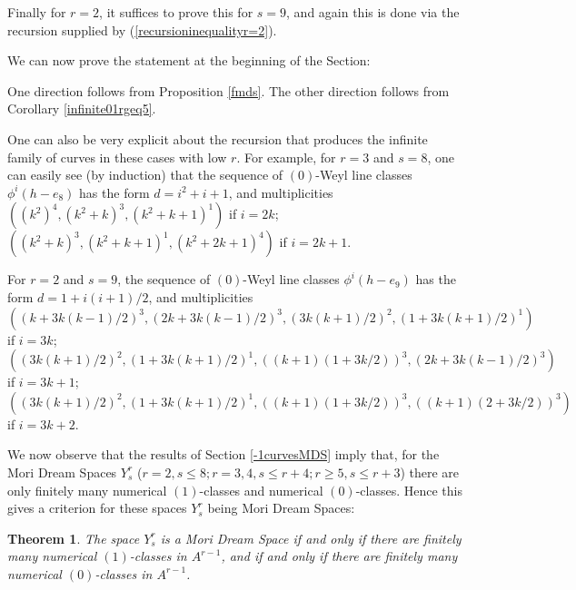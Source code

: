 \documentclass[12pt]{article}
\newtheorem{theorem}[equation]{Theorem}
\numberwithin{equation}{section}
\numberwithin{subeq}{equation}
\begin{document}
Finally for $r=2$, it suffices to prove this for $s=9$, and again this is done via
the recursion supplied by (\ref{recursioninequalityr=2}).


We can now prove the statement at the beginning of the Section:



\medskip{}
One direction follows from Proposition \ref{fmds}. The other direction follows from Corollary \ref{infinite01rgeq5}.


One can also be very explicit about the recursion that produces the infinite family of curves in these cases with low $r$.
For example, for $r=3$ and $s=8$, one can easily see (by induction) that the sequence of $(0)$-Weyl line classes $\phi^{i}(h-e_8)$ has the form $d = i^2+i+1$, and multiplicities
$((k^2)^4, (k^2+k)^3, (k^2+k+1)^1)$ if $i=2k$;
$((k^2+k)^3, (k^2+k+1)^1,(k^2+2k+1)^4)$ if $i=2k+1$.

For $r=2$ and $s=9$, 
the sequence of $(0)$-Weyl line classes $\phi^{i}(h-e_9)$ has the form
$d = 1+i(i+1)/2$, and multiplicities
$((k+3k(k-1)/2)^3, (2k+3k(k-1)/2)^3, (3k(k+1)/2)^2, (1+3k(k+1)/2)^1)$ if $i=3k$;
$((3k(k+1)/2)^2, (1+3k(k+1)/2)^1, ((k+1)(1+3k/2))^3, (2k+3k(k-1)/2)^3)$ if $i=3k+1$;
$((3k(k+1)/2)^2, (1+3k(k+1)/2)^1, ((k+1)(1+3k/2))^3, ((k+1)(2+3k/2))^3)$ if $i=3k+2$.


We now observe that the results of Section \ref{-1curvesMDS} imply that,
for the Mori Dream Spaces $Y^r_s$
($r=2, s \leq 8; r=3,4, s \leq r+4; r \geq 5, s \leq r+3$)
there are only finitely many numerical $(1)$-classes
and numerical $(0)$-classes.
Hence this gives a criterion for these spaces $Y^r_s$ being Mori Dream Spaces:


\begin{theorem}\label{finiteclass}
The space $Y^r_s$ is a Mori Dream Space
if and only if there are finitely many numerical $(1)$-classes in $A^{r-1}$,
and if and only if there are finitely many numerical $(0)$-classes in $A^{r-1}$.
\end{theorem}
\end{document}
